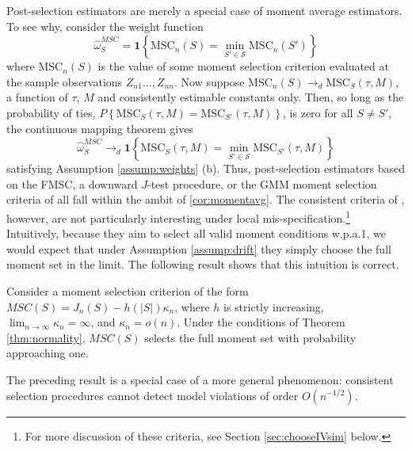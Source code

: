 Post-selection estimators are merely a special case of moment average estimators.
To see why, consider the weight function
$$\widehat{\omega}_S^{MSC} = \mathbf{1}\left\{\mbox{MSC}_n(S) = \min_{S'\in \mathscr{S}} \mbox{MSC}_n(S')\right\}$$where $\mbox{MSC}_n(S)$ is the value of some moment selection criterion evaluated at the sample observations $Z_{n1}\hdots, Z_{nn}$. 
Now suppose $\mbox{MSC}_n(S) \rightarrow_d\mbox{MSC}_S(\tau,M)$, a function of $\tau$, $M$ and consistently estimable constants only. 
Then, so long as the probability of ties, $P\left\{\mbox{MSC}_S(\tau,M) = \mbox{MSC}_{S'}(\tau,M) \right\}$, is zero for all $S\neq S'$, the continuous mapping theorem gives 
	$$\widehat{\omega}_S^{MSC} \rightarrow_d \mathbf{1}\left\{\mbox{MSC}_S(\tau,M) = \min_{S'\in \mathscr{S}} \mbox{MSC}_{S'}(\tau,M)\right\}$$ 
satisfying Assumption \ref{assump:weights} (b). 
Thus, post-selection estimators based on the FMSC, a downward $J$-test procedure, or the GMM moment selection criteria of \cite{Andrews1999} all fall within the ambit of \ref{cor:momentavg}. 
The consistent criteria of \cite{Andrews1999}, however, are not particularly interesting under local mis-specification.\footnote{For more discussion of these criteria, see Section \ref{sec:chooseIVsim} below.}
Intuitively, because they aim to select all valid moment conditions w.p.a.1, we would expect that under Assumption \ref{assump:drift} they simply choose the full moment set in the limit. 
The following result shows that this intuition is correct. 
\begin{thm}
\label{pro:andrews}
Consider a moment selection criterion of the form $MSC(S) = J_n(S) - h(|S|)\kappa_n$, where $h$ is strictly increasing,  $\lim_{n\rightarrow \infty}\kappa_n = \infty$, and $\kappa_n = o(n)$. Under the conditions of Theorem \ref{thm:normality}, $MSC(S)$ selects the full moment set with probability approaching one.
\end{thm}
The preceding result is a special case of a more general phenomenon: consistent selection procedures cannot detect model violations of order $O(n^{-1/2})$.

